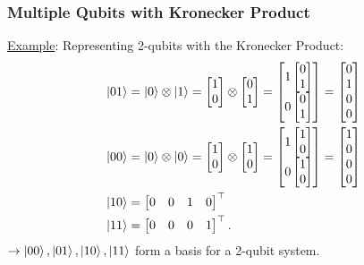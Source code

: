 \documentclass{beamer}
\theoremstyle{definition}
\begin{document}
\begin{frame}
\frametitle{Multiple Qubits with Kronecker Product}
\underline{Example}: Representing 2-qubits with the Kronecker Product:
\begin{align*}
&\left\vert{01}\right\rangle = \left\vert{0}\right\rangle \otimes \left\vert{1}\right\rangle = \begin{bmatrix}
1\\0
\end{bmatrix}\otimes 
\begin{bmatrix}
0\\1
\end{bmatrix}
=
\begin{bmatrix}
1\begin{bmatrix}
0\\1
\end{bmatrix}\\
0\begin{bmatrix}
0\\1
\end{bmatrix}
\end{bmatrix} = \begin{bmatrix}
0\\1\\0\\0
\end{bmatrix}\\
&\left\vert{00}\right\rangle = \left\vert{0}\right\rangle \otimes \left\vert{0}\right\rangle = \begin{bmatrix}
1\\0
\end{bmatrix}\otimes 
\begin{bmatrix}
1\\0
\end{bmatrix}
=
\begin{bmatrix}
1\begin{bmatrix}
1\\0
\end{bmatrix}\\
0\begin{bmatrix}
1\\0
\end{bmatrix}
\end{bmatrix} = \begin{bmatrix}
1\\0\\0\\0
\end{bmatrix}\\
&\left\vert{10}\right\rangle = \begin{bmatrix}
0&0&1&0
\end{bmatrix}^\top\\ &\left\vert{11}\right\rangle = \begin{bmatrix}
0&0&0&1
\end{bmatrix}^\top.
\end{align*}
$\rightarrow \left\vert{00}\right\rangle, \left\vert{01}\right\rangle, \left\vert{10}\right\rangle, \left\vert{11}\right\rangle$ form a basis for a 2-qubit system.
\end{frame}
\end{document}
